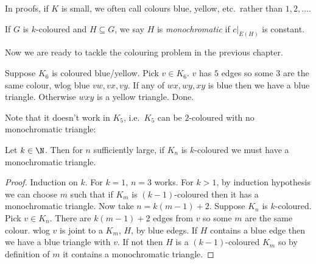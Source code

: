 \documentclass[a4paper]{article}
\begin{document}
In proofs, if \(K\) is small, we often call colours blue, yellow, etc.\ rather than \(1, 2, \dots\).

\begin{definition}[monochromatic]
  If \(G\) is \(k\)-coloured and \(H \subseteq G\), we say \(H\) is \emph{monochromatic} if \(c|_{E(H)}\) is constant.
\end{definition}

Now we are ready to tackle the colouring problem in the previous chapter.

\begin{eg}
  Suppose \(K_6\) is coloured blue/yellow. Pick \(v \in K_6\). \(v\) has \(5\) edges so some \(3\) are the same colour, wlog blue \(vw, vx, vy\). If any of \(wx, wy, xy\) is blue then we have a blue triangle. Otherwise \(wxy\) is a yellow triangle. Done.
\end{eg}

\begin{note}
  Note that it doesn't work in \(K_5\), i.e.\ \(K_5\) can be \(2\)-coloured with no monochromatic triangle:
  \begin{center}
  \end{center}
\end{note}

\begin{proposition}
  Let \(k \in \N\). Then for \(n\) sufficiently large, if \(K_n\) is \(k\)-coloured we must have a monochromatic triangle.
\end{proposition}

\begin{proof}
  Induction on \(k\). For \(k = 1\), \(n = 3\) works. For \(k > 1\), by induction hypothesis we can choose \(m\) such that if \(K_m\) is \((k - 1)\)-coloured then it has a monochromatic triangle. Now take \(n = k(m - 1) + 2\). Suppose \(K_n\) is \(k\)-coloured. Pick \(v \in K_n\). There are \(k(m - 1) + 2\) edges from \(v\) so some \(m\) are the same colour. wlog \(v\) is joint to a \(K_m\), \(H\), by blue edegs. If \(H\) contains a blue edge then we have a blue triangle with \(v\). If not then \(H\) is a \((k - 1)\)-coloured \(K_m\) so by definition of \(m\) it contains a monochromatic triangle.
\end{proof}
\end{document}
